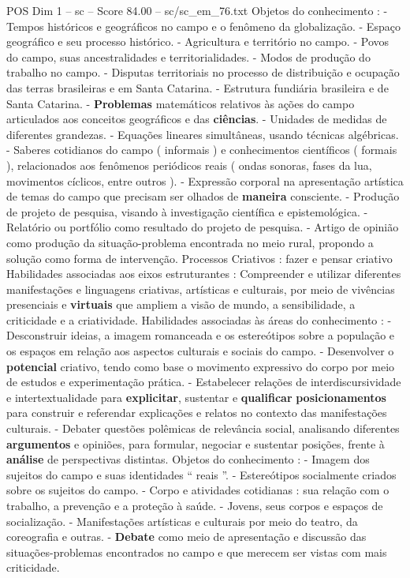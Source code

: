 \begin{textsample}{POS Dim 1 – sc – Score 84.00 – sc/sc\_em\_76.txt}
Objetos do conhecimento : - Tempos históricos e geográficos no campo e o fenômeno da globalização. - Espaço geográfico e seu processo histórico. - Agricultura e território no campo. - Povos do campo, suas ancestralidades e territorialidades. - Modos de produção do trabalho no campo. - Disputas territoriais no processo de distribuição e ocupação das terras brasileiras e em Santa Catarina. - Estrutura fundiária brasileira e de Santa Catarina. - \textbf{Problemas} matemáticos relativos às ações do campo articulados aos conceitos geográficos e das \textbf{ciências}. - Unidades de medidas de diferentes grandezas. - Equações lineares simultâneas, usando técnicas algébricas. - Saberes cotidianos do campo ( informais ) e conhecimentos científicos ( formais ), relacionados aos fenômenos periódicos reais ( ondas sonoras, fases da lua, movimentos cíclicos, entre outros ). - Expressão corporal na apresentação artística de temas do campo que precisam ser olhados de \textbf{maneira} consciente. - Produção de projeto de pesquisa, visando à investigação científica e epistemológica. - Relatório ou portfólio como resultado do projeto de pesquisa. - Artigo de opinião como produção da situação-problema encontrada no meio rural, propondo a solução como forma de intervenção.
Processos Criativos : fazer e pensar criativo Habilidades associadas aos eixos estruturantes : Compreender e utilizar diferentes manifestações e linguagens criativas, artísticas e culturais, por meio de vivências presenciais e \textbf{virtuais} que ampliem a visão de mundo, a sensibilidade, a criticidade e a criatividade.
Habilidades associadas às áreas do conhecimento : - Desconstruir ideias, a imagem romanceada e os estereótipos sobre a população e os espaços em relação aos aspectos culturais e sociais do campo. - Desenvolver o \textbf{potencial} criativo, tendo como base o movimento expressivo do corpo por meio de estudos e experimentação prática. - Estabelecer relações de interdiscursividade e intertextualidade para \textbf{explicitar}, sustentar e \textbf{qualificar} \textbf{posicionamentos} para construir e referendar explicações e relatos no contexto das manifestações culturais. - Debater questões polêmicas de relevância social, analisando diferentes \textbf{argumentos} e opiniões, para formular, negociar e sustentar posições, frente à \textbf{análise} de perspectivas distintas.
Objetos do conhecimento : - Imagem dos sujeitos do campo e suas identidades “ reais ”. - Estereótipos socialmente criados sobre os sujeitos do campo. - Corpo e atividades cotidianas : sua relação com o trabalho, a prevenção e a proteção à saúde. - Jovens, seus corpos e espaços de socialização. - Manifestações artísticas e culturais por meio do teatro, da coreografia e outras. - \textbf{Debate} como meio de apresentação e discussão das situações-problemas encontrados no campo e que merecem ser vistas com mais criticidade.

\end{textsample}
